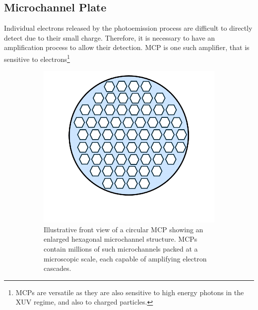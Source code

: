 \subsection{Microchannel Plate}
Individual electrons released by the photoemission process are difficult to directly detect due to their small charge.  Therefore, it is necessary to have an amplification process to allow their detection. \Gls{MCP} is one such amplifier, that is sensitive to electrons\footnote{\Glspl{MCP} are versatile as they are also sensitive to high energy photons in the \gls{XUV} regime, and also to charged particles.}

\begin{figure}[h]
    \centering
    \begin{subfigure}[t]{0.49\linewidth}
        \centering
        \includegraphics[width=\linewidth]{images/mcp.pdf}
        \caption{Illustrative front view of a circular \gls{MCP} showing an enlarged hexagonal microchannel structure. \Glspl{MCP} contain millions of such microchannels packed at a microscopic scale, each capable of amplifying electron cascades.}
        \label{fig:mcp}
    \end{subfigure}
    \hfill
    \begin{subfigure}[t]{0.49\linewidth}
        \centering

\end{subfigure}
\end{figure}
